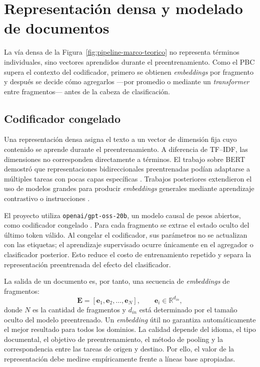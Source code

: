 \section{Representación densa y modelado de documentos}
\label{sec:representacion_densa}

La vía densa de la Figura~\ref{fig:pipeline-marco-teorico} no representa términos individuales, sino vectores aprendidos durante el preentrenamiento. Como el PBC supera el contexto del codificador, primero se obtienen \textit{embeddings} por fragmento y después se decide cómo agregarlos ---por promedio o mediante un \textit{transformer} entre fragmentos--- antes de la cabeza de clasificación.

\subsection{Codificador congelado}

Una representación densa asigna el texto a un vector de dimensión fija cuyo contenido se aprende durante el preentrenamiento. A diferencia de TF--IDF, las dimensiones no corresponden directamente a términos. El trabajo sobre BERT demostró que representaciones bidireccionales preentrenadas podían adaptarse a múltiples tareas con pocas capas específicas \parencite{devlin2019bert}. Trabajos posteriores extendieron el uso de modelos grandes para producir \textit{embeddings} generales mediante aprendizaje contrastivo o instrucciones \parencite{wang2024improvingembeddings,e5multilingual2024}.

El proyecto utiliza \texttt{openai/gpt-oss-20b}, un modelo causal de pesos abiertos, como codificador congelado \parencite{agarwal2025gptoss}. Para cada fragmento se extrae el estado oculto del último token válido. Al congelar el codificador, sus parámetros no se actualizan con las etiquetas; el aprendizaje supervisado ocurre únicamente en el agregador o clasificador posterior. Esto reduce el costo de entrenamiento repetido y separa la representación preentrenada del efecto del clasificador.

La salida de un documento es, por tanto, una secuencia de \textit{embeddings} de fragmentos:
\[
\mathbf{E} = [\mathbf{e}_1, \mathbf{e}_2, \dots, \mathbf{e}_N], \qquad \mathbf{e}_i \in \mathbb{R}^{d_{in}},
\]
donde $N$ es la cantidad de fragmentos y $d_{in}$ está determinado por el tamaño oculto del modelo preentrenado. Un \textit{embedding} útil no garantiza automáticamente el mejor resultado para todos los dominios. La calidad depende del idioma, el tipo documental, el objetivo de preentrenamiento, el método de pooling y la correspondencia entre las tareas de origen y destino. Por ello, el valor de la representación debe medirse empíricamente frente a líneas base apropiadas.

